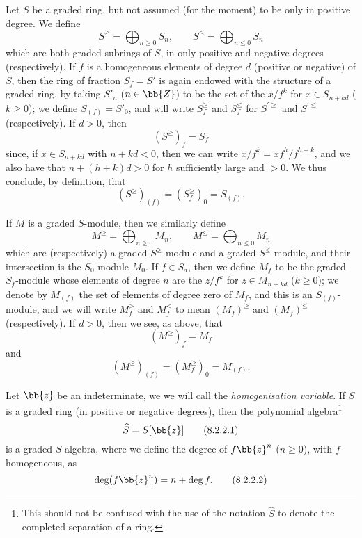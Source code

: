 \begin{env}[8.2.1]
\label{II.8.2.1}
Let $S$ be a graded ring, but not assumed (for the moment) to be only in positive degree.
We define
\[
\label{II.8.2.1.1}
  S^\geq = \bigoplus_{n\geq0} S_n,
  \qquad
  S^\leq = \bigoplus_{n\leq0} S_n
\tag{8.2.1.1}
\]
which are both graded subrings of $S$, in only positive and negative degrees (respectively).
If $f$ is a homogeneous elements of degree $d$ (positive or negative) of $S$, then the ring of fraction $S_f=S'$ is again endowed with the structure of a graded ring, by taking $S'_n$ ($n\in\bb{Z}$) to be the set of the $x/f^k$ for $x\in S_{n+kd}$ ($k\geq0$);
we define $S_{(f)}=S'_0$, and will write $S_f^\geq$ and $S_f^\leq$ for $S^{'\geq}$ and $S^{'\leq}$ (respectively).
If $d>0$, then
\[
\label{II.8.2.1.2}
  (S^\geq)_f = S_f
\tag{8.2.1.2}
\]
since, if $x\in S_{n+kd}$ with $n+kd<0$, then we can write $x/f^k = xf^h/f^{h+k}$, and we also have that $n+(h+k)d>0$ for $h$ sufficiently large and $>0$.
We thus conclude, by definition, that
\[
\label{II.8.2.1.3}
  (S^\geq)_{(f)} = (S_f^\geq)_0 = S_{(f)}.
\tag{8.2.1.3}
\]

If $M$ is a graded $S$-module, then we similarly define
\[
\label{II.8.2.1.4}
  M^\geq = \bigoplus_{n\geq0} M_n,
  \qquad
  M^\leq = \bigoplus_{n\leq0} M_n
\tag{8.2.1.4}
\]
which are (respectively) a graded $S^\geq$-module and a graded $S^\leq$-module, and their intersection is the $S_0$ module $M_0$.
If $f\in S_d$, then we define $M_f$ to be the graded $S_f$-module whose elements of degree $n$ are the $z/f^k$ for $z\in M_{n+kd}$ ($k\geq0$);
we denote by $M_{(f)}$ the set of elements of degree zero of $M_f$, and this is an $S_{(f)}$-module, and we will write $M_f^\geq$ and $M_f^\leq$ to mean $(M_f)^\geq$ and $(M_f)^\leq$ (respectively).
If $d>0$, then we see, as above, that
\[
\label{II.8.2.1.5}
  (M^\geq)_f = M_f
\tag{8.2.1.5}
\]
and
\[
\label{II.8.2.1.6}
  (M^\geq)_{(f)} = (M_f^\geq)_0 = M_{(f)}.
\tag{8.2.1.6}
\]
\end{env}

\begin{env}[8.2.2]
\label{II.8.2.2}
Let $\bb{z}$ be an indeterminate, we we will call the \emph{homogenisation variable}.
If $S$ is a graded ring (in positive or negative degrees), then the polynomial algebra\footnote{This should not be confused with the use of the notation $\widehat{S}$ to denote the completed separation of a ring.}
\[
\label{II.8.2.2.1}
  \widehat{S} = S[\bb{z}]
\tag{8.2.2.1}
\]
is a graded $S$-algebra, where we define the degree of $f\bb{z}^n$ ($n\geq0$), with $f$ homogeneous, as
\[
\label{II.8.2.2.2}
  \deg(f\bb{z}^n) = n+\deg f.
\tag{8.2.2.2}
\]
\end{env}

